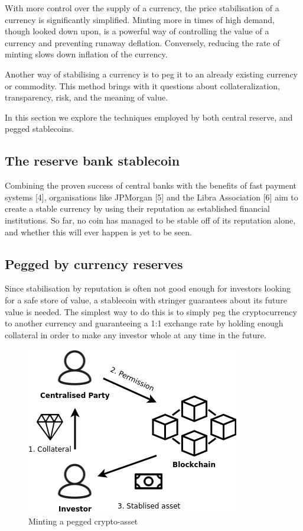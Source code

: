 \documentclass[english,]{IEEEtran}
\begin{document}
With more control over the supply of a currency, the price stabilisation
of a currency is significantly simplified. Minting more in times of high
demand, though looked down upon, is a powerful way of controlling the
value of a currency and preventing runaway deflation. Conversely,
reducing the rate of minting slows down inflation of the currency.

Another way of stabilising a currency is to peg it to an already
existing currency or commodity. This method brings with it questions
about collateralization, transparency, risk, and the meaning of value.

In this section we explore the techniques employed by both central
reserve, and pegged stablecoins.

\subsection{The reserve bank
stablecoin}\label{the-reserve-bank-stablecoin}

Combining the proven success of central banks with the benefits of fast
payment systems {[}4{]}, organisations like JPMorgan {[}5{]} and the
Libra Association {[}6{]} aim to create a stable currency by using their
reputation as established financial institutions. So far, no coin has
managed to be stable off of its reputation alone, and whether this will
ever happen is yet to be seen.

\subsection{Pegged by currency
reserves}\label{pegged-by-currency-reserves}

Since stabilisation by reputation is often not good enough for investors
looking for a safe store of value, a stablecoin with stringer guarantees
about its future value is needed. The simplest way to do this is to
simply peg the cryptocurrency to another currency and guaranteeing a 1:1
exchange rate by holding enough collateral in order to make any investor
whole at any time in the future.

\begin{figure}[htbp]
\centering
\includegraphics{img/Centralised_create.png}
\caption{Minting a pegged crypto-asset \label{cent_create_label}}
\end{figure}
\end{document}
